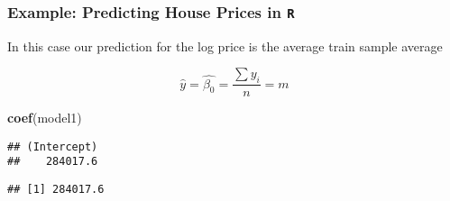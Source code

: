 \documentclass[
  shownotes,
  xcolor={svgnames},
  hyperref={colorlinks,citecolor=DarkBlue,linkcolor=DarkRed,urlcolor=DarkBlue}
  ]{beamer}
\newenvironment{Shaded}{\begin{snugshade}}{\end{snugshade}}
\newcommand{\KeywordTok}[1]{\textcolor[rgb]{0.13,0.29,0.53}{\textbf{#1}}}
\newcommand{\NormalTok}[1]{#1}
\newcommand{\OperatorTok}[1]{\textcolor[rgb]{0.81,0.36,0.00}{\textbf{#1}}}
\begin{document}
\begin{frame}[fragile]
\frametitle{Example: Predicting House Prices in \texttt{R}}

In this case our prediction for the log price is the average train
sample average

\[
\hat{y}=\hat{\beta_0}=\frac{\sum y_i}{n}=m
\]

\begin{Shaded}
\footnotesize
\begin{Highlighting}[]
\KeywordTok{coef}\NormalTok{(model1)}
\end{Highlighting}
\end{Shaded}

\begin{tiny}
\begin{verbatim}
## (Intercept) 
##    284017.6
\end{verbatim}
\end{tiny}

\begin{Shaded}
\footnotesize
{}
\end{Shaded}

\begin{tiny}
\begin{verbatim}
## [1] 284017.6
\end{verbatim}
\end{tiny}

\end{frame}
\end{document}
